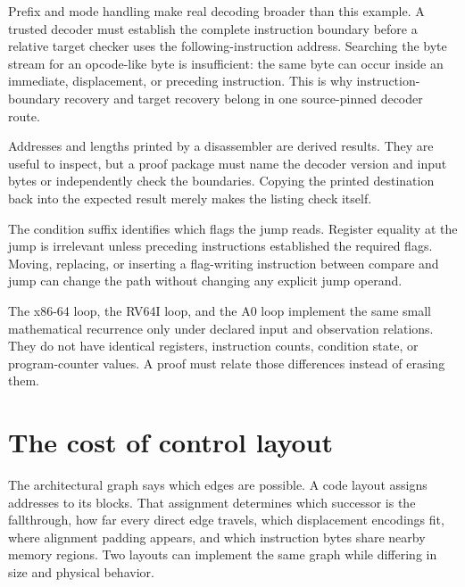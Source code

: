 Prefix and mode handling make real decoding broader than this example. A
trusted decoder must establish the complete instruction boundary before a
relative target checker uses the following-instruction address. Searching the
byte stream for an opcode-like byte is insufficient: the same byte can occur
inside an immediate, displacement, or preceding instruction. This is why
instruction-boundary recovery and target recovery belong in one source-pinned
decoder route.

\begin{warning}[title={A disassembler listing is evidence only through its decoder}]
Addresses and lengths printed by a disassembler are derived results. They are
useful to inspect, but a proof package must name the decoder version and input
bytes or independently check the boundaries. Copying the printed destination
back into the expected result merely makes the listing check itself.
\end{warning}

\begin{warning}[title={A flag-reading jump has a hidden-looking input}]
The condition suffix identifies which flags the jump reads. Register equality
at the jump is irrelevant unless preceding instructions established the
required flags. Moving, replacing, or inserting a flag-writing instruction
between compare and jump can change the path without changing any explicit
jump operand.
\end{warning}

The x86-64 loop, the RV64I loop, and the A0 loop implement the same small
mathematical recurrence only under declared input and observation relations.
They do not have identical registers, instruction counts, condition state, or
program-counter values. A proof must relate those differences instead of
erasing them.

\section{The cost of control layout}

The architectural graph says which edges are possible. A code layout assigns
addresses to its blocks. That assignment determines which successor is the
fallthrough, how far every direct edge travels, which displacement encodings
fit, where alignment padding appears, and which instruction bytes share nearby
memory regions. Two layouts can implement the same graph while differing in
size and physical behavior.

